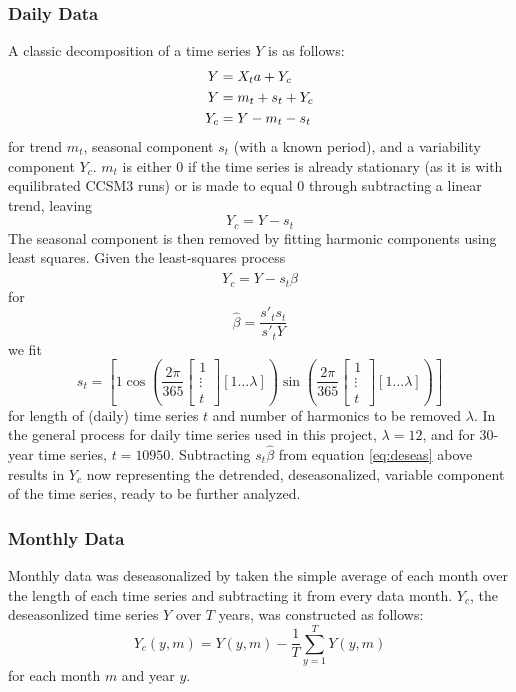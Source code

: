 \documentclass{article}
\begin{document}
\subsubsection{Daily Data} %
A classic decomposition of a time series $Y$ is as follows: 
\begin{equation}
\begin{aligned}\centering
Y &= X_ta + Y_c \\
Y &= m_t + s_t + Y_c \\ 
Y_c &= Y - m_t - s_t 
\end{aligned}\end{equation}
for trend $m_t$, seasonal component $s_t$ (with a known period), and a variability component $Y_c$. $m_t$ is either $0$ if the time series is already stationary (as it is with equilibrated CCSM3 runs) or is made to equal $0$ through subtracting a linear trend, leaving
\begin{equation}
Y_c = Y-s_t
\end{equation}
The seasonal component is then removed by fitting harmonic components using least squares. Given the least-squares process
\begin{equation}Y_c = Y-s_t\hat{\beta}\label{eq:deseas}\end{equation}
for 
$$\hat{\beta} = \frac{s'_ts_t}{s'_tY}$$
we fit
\begin{equation}
s_t = \left[1 \cos\left(\frac{2\pi}{365}\left[\begin{matrix}1 \\ \vdots \\ t\end{matrix}\right][1 \hdots \lambda]\right) \sin\left(\frac{2\pi}{365}\left[\begin{matrix}1 \\ \vdots \\ t\end{matrix}\right][1 \hdots \lambda]\right) \right]
\end{equation}
for length of (daily) time series $t$ and number of harmonics to be removed $\lambda$. In the general process for daily time series used in this project, $\lambda = 12$, and for 30-year time series, $t = 10950$. Subtracting $s_t\hat{\beta}$ from equation \ref{eq:deseas} above results in $Y_c$ now representing the detrended, deseasonalized, variable component of the time series, ready to be further analyzed. 

\subsubsection{Monthly Data} %
Monthly data was deseasonalized by taken the simple average of each month over the length of each time series and subtracting it from every data month. $Y_c$, the deseasonlized time series $Y$ over $T$ years, was constructed as follows: 
\begin{equation}
Y_c(y,m) = Y(y,m) - \frac{1}{T}\sum_{y=1}^T Y(y,m)
\end{equation}
for each month $m$ and year $y$.
\end{document}

